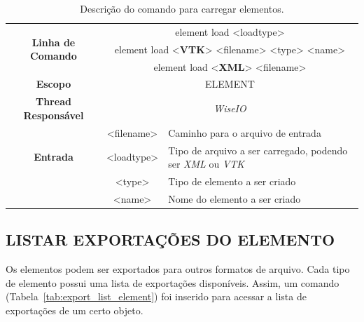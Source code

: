 \begin{center}
	\begin{table}[!htbp]
		\begin{tabularx}{\textwidth}{c|c|X}
			\toprule
			\multirow{3}{*}{\textbf{Linha de Comando}} & \multicolumn{2}{c}{element load <load\underline{\space\space}type>} \\
			& \multicolumn{2}{c}{element load <\textbf{VTK}> <filename> <type> <name>} \\
			& \multicolumn{2}{c}{element load <\textbf{XML}> <filename>} \\
			\midrule
			\textbf{Escopo} & \multicolumn{2}{c}{ELEMENT} \\
			\hline
			\textbf{Thread Responsável} & \multicolumn{2}{c}{\textit{WiseIO}} \\
			\hline
			\multirow{3}{*}{\textbf{Entrada}} & <filename> & Caminho para o arquivo de entrada \\
			& <load\underline{\space\space}type> & Tipo de arquivo a ser carregado, podendo ser \textit{XML} ou \textit{VTK} \\
			& <type> & Tipo de elemento a ser criado \\
			& <name> & Nome do elemento a ser criado \\
			\bottomrule
		\end{tabularx}
		\caption{Descrição do comando para carregar elementos.}
		\label{tab:load_element}
	\end{table}
\end{center}

\subsection{LISTAR EXPORTAÇÕES DO ELEMENTO}\label{sec:export_list_element}

Os elementos podem ser exportados para outros formatos de arquivo. Cada tipo de elemento possui uma lista de exportações disponíveis. Assim, um comando (Tabela~\ref{tab:export_list_element}) foi inserido para acessar a lista de exportações de um certo objeto.

